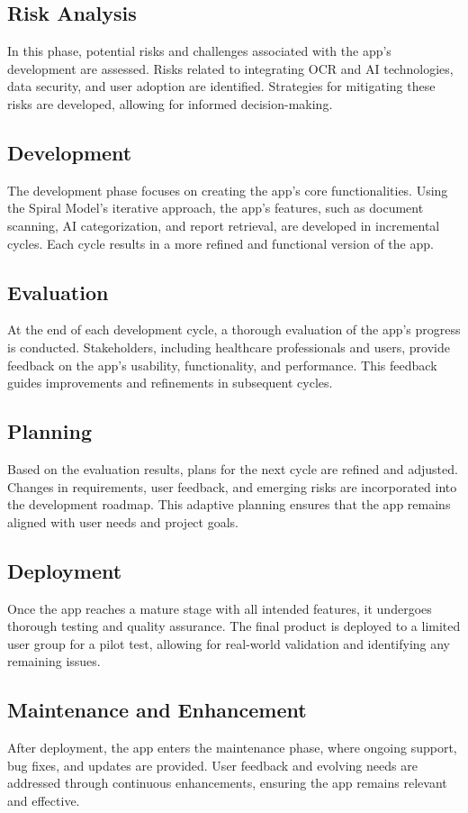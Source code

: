 \subsection*{Risk Analysis}
In this phase, potential risks and challenges associated with the app's development are assessed. Risks related to integrating OCR and AI technologies, data security, and user adoption are identified. Strategies for mitigating these risks are developed, allowing for informed decision-making.
\subsection*{Development}
The development phase focuses on creating the app's core functionalities. Using the Spiral Model's iterative approach, the app's features, such as document scanning, AI categorization, and report retrieval, are developed in incremental cycles. Each cycle results in a more refined and functional version of the app.
\subsection*{Evaluation}
At the end of each development cycle, a thorough evaluation of the app's progress is conducted. Stakeholders, including healthcare professionals and users, provide feedback on the app's usability, functionality, and performance. This feedback guides improvements and refinements in subsequent cycles.
\subsection*{Planning}
Based on the evaluation results, plans for the next cycle are refined and adjusted. Changes in requirements, user feedback, and emerging risks are incorporated into the development roadmap. This adaptive planning ensures that the app remains aligned with user needs and project goals.
\subsection*{Deployment}
Once the app reaches a mature stage with all intended features, it undergoes thorough testing and quality assurance. The final product is deployed to a limited user group for a pilot test, allowing for real-world validation and identifying any remaining issues.
\subsection*{Maintenance and Enhancement}
After deployment, the app enters the maintenance phase, where ongoing support, bug fixes, and updates are provided. User feedback and evolving needs are addressed through continuous enhancements, ensuring the app remains relevant and effective.

